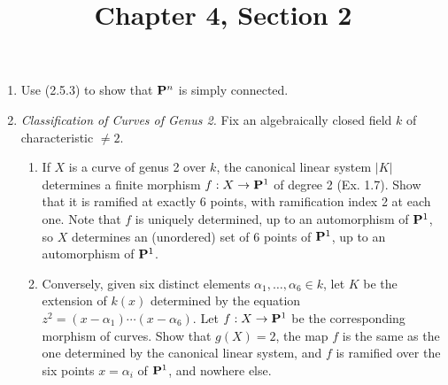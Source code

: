 \documentclass{article}
\title{Chapter 4, Section 2}
\begin{document}
\maketitle
\begin{enumerate} [label=\textbf{\arabic*.}, leftmargin=0em]

\item Use (2.5.3) to show that $\mathbf{P}^n$ is simply connected.

\item \textit{Classification of Curves of Genus 2.} Fix an algebraically closed field $k$ of characteristic $\neq 2$.
\begin{enumerate} [label=(\alph*)]
  \item If $X$ is a curve of genus 2 over $k$, the canonical linear system $|K|$ determines a finite morphism $f : X \to \mathbf{P}^1$ of degree 2 (Ex. 1.7). Show that it is ramified at exactly 6 points, with ramification index 2 at each one.
  Note that $f$ is uniquely determined, up to an automorphism of $\mathbf{P}^1$, so $X$ determines an (unordered) set of 6 points of $\mathbf{P}^1$, up to an automorphism of $\mathbf{P}^1$.

  \item Conversely, given six distinct elements $\alpha_1, \dots, \alpha_6 \in k$, let $K$ be the extension of $k(x)$ determined by the equation $z^2 = (x - \alpha_1) \cdots (x-\alpha_6)$.
  Let $f : X \to \mathbf{P}^1$ be the corresponding morphism of curves.
  Show that $g(X) = 2$, the map $f$ is the same as the one determined by the canonical linear system, and $f$ is ramified over the six points $x = \alpha_i$ of $\mathbf{P}^1$, and nowhere else.
\end{enumerate}

\end{enumerate}
\end{document}
